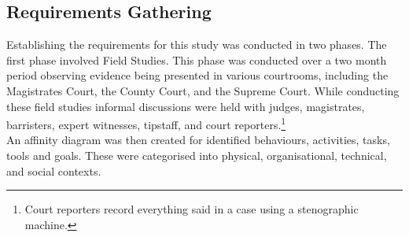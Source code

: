 \subsection{Requirements Gathering}
Establishing the requirements for this study was conducted in two phases. The first phase involved Field Studies. This phase was conducted over a two month period observing evidence being presented in various courtrooms, including the Magistrates Court, the County Court, and the Supreme Court. While conducting these field studies informal discussions were held with judges, magistrates, barristers, expert witnesses, tipstaff, and court reporters.\footnote{Court reporters record everything said in a case using a stenographic machine.  }\\
An affinity diagram was then created for identified behaviours, activities, tasks, tools and goals. These were categorised into physical, organisational, technical, and social contexts.


